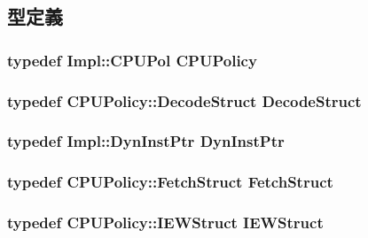 \subsection{型定義}
\hypertarget{classFullO3CPU_a622513cd9a0b12a706b26c3320585f92}{
\subsubsection[{CPUPolicy}]{\setlength{\rightskip}{0pt plus 5cm}typedef Impl::CPUPol {\bf CPUPolicy}}}
\label{classFullO3CPU_a622513cd9a0b12a706b26c3320585f92}
\hypertarget{classFullO3CPU_ae7f8b193f518ed524a498ef7ab564902}{
\subsubsection[{DecodeStruct}]{\setlength{\rightskip}{0pt plus 5cm}typedef CPUPolicy::DecodeStruct {\bf DecodeStruct}}}
\label{classFullO3CPU_ae7f8b193f518ed524a498ef7ab564902}
\hypertarget{classFullO3CPU_a028ce10889c5f6450239d9e9a7347976}{
\subsubsection[{DynInstPtr}]{\setlength{\rightskip}{0pt plus 5cm}typedef Impl::DynInstPtr {\bf DynInstPtr}}}
\label{classFullO3CPU_a028ce10889c5f6450239d9e9a7347976}
\hypertarget{classFullO3CPU_ae885ff43c757f445563029fd15cdf70c}{
\subsubsection[{FetchStruct}]{\setlength{\rightskip}{0pt plus 5cm}typedef CPUPolicy::FetchStruct {\bf FetchStruct}}}
\label{classFullO3CPU_ae885ff43c757f445563029fd15cdf70c}
\hypertarget{classFullO3CPU_a8ca44c33753253e21ca215123e8b5005}{
\subsubsection[{IEWStruct}]{\setlength{\rightskip}{0pt plus 5cm}typedef CPUPolicy::IEWStruct {\bf IEWStruct}}}
